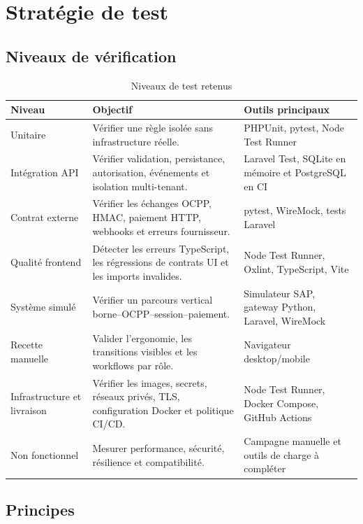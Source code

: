 \chapter{Stratégie de test}

\section{Niveaux de vérification}

\begin{table}[H]
\centering
\caption{Niveaux de test retenus}
\begin{tabularx}{\textwidth}{|L{3.2cm}|Y|L{3.4cm}|}
\hline
{}\textbf{Niveau} & \textbf{Objectif} & \textbf{Outils principaux} \\ \hline
Unitaire & Vérifier une règle isolée sans infrastructure réelle. & PHPUnit, pytest, Node Test Runner \\ \hline
Intégration API & Vérifier validation, persistance, autorisation, événements et isolation multi-tenant. & Laravel Test, SQLite en mémoire et PostgreSQL en CI \\ \hline
Contrat externe & Vérifier les échanges OCPP, HMAC, paiement HTTP, webhooks et erreurs fournisseur. & pytest, WireMock, tests Laravel \\ \hline
Qualité frontend & Détecter les erreurs TypeScript, les régressions de contrats UI et les imports invalides. & Node Test Runner, Oxlint, TypeScript, Vite \\ \hline
Système simulé & Vérifier un parcours vertical borne--OCPP--session--paiement. & Simulateur SAP, gateway Python, Laravel, WireMock \\ \hline
Recette manuelle & Valider l'ergonomie, les transitions visibles et les workflows par rôle. & Navigateur desktop/mobile \\ \hline
Infrastructure et livraison & Vérifier les images, secrets, réseaux privés, TLS, configuration Docker et politique CI/CD. & Node Test Runner, Docker Compose, GitHub Actions \\ \hline
Non fonctionnel & Mesurer performance, sécurité, résilience et compatibilité. & Campagne manuelle et outils de charge à compléter \\ \hline
\end{tabularx}
\end{table}

\section{Principes}


